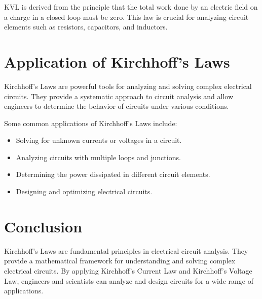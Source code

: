 \documentclass{article}
\begin{document}
KVL is derived from the principle that the total work done by an electric field on a charge in a closed loop must be zero. This law is crucial for analyzing circuit elements such as resistors, capacitors, and inductors.

\section{Application of Kirchhoff's Laws}
Kirchhoff's Laws are powerful tools for analyzing and solving complex electrical circuits. They provide a systematic approach to circuit analysis and allow engineers to determine the behavior of circuits under various conditions.

Some common applications of Kirchhoff's Laws include:
\begin{itemize}
\item Solving for unknown currents or voltages in a circuit.
\item Analyzing circuits with multiple loops and junctions.
\item Determining the power dissipated in different circuit elements.
\item Designing and optimizing electrical circuits.
\end{itemize}

\section{Conclusion}
Kirchhoff's Laws are fundamental principles in electrical circuit analysis. They provide a mathematical framework for understanding and solving complex electrical circuits. By applying Kirchhoff's Current Law and Kirchhoff's Voltage Law, engineers and scientists can analyze and design circuits for a wide range of applications.
\end{document}
